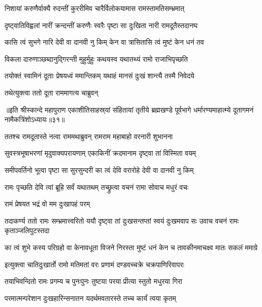 \twolineshloka
{निशायां करुणैर्वाक्यै रुदन्तीं कुररीमिव}
{चारैर्विलोकयामास रामस्तामतिसम्भ्रमात्}%

\twolineshloka
{दृष्ट्वातिविह्वलां नारीं क्रन्दन्तीं करुणैः स्वरैः}
{पृष्टा सा दुःखिता नारी रामदूतैस्तदानघ}%


\twolineshloka
{कासि त्वं सुभगे नारि देवी वा दानवी नु किम्}
{केन वा त्रासितासि त्वं मुष्टं केन धनं तव}%

\twolineshloka
{विकला दारुणाञ्छब्दानुद्गिरन्ती मुहुर्मुहुः}
{कथयस्व यथातथ्यं रामो राजाभिपृच्छति}%

\twolineshloka
{तयोक्तं स्वामिनं दूताः प्रेषयध्वं ममान्तिकम्}
{यथाहं मानसं दुःखं शान्त्यै तस्मै निवेदये}%

\onelineshloka
{तथेत्युक्त्वा ततो दूता राममागत्य चाब्रुवन्}%

॥इति श्रीस्कान्दे महापुराण एकाशीतिसाहस्र्यां संहितायां तृतीये ब्रह्मखण्डे पूर्वभागे धर्मारण्यमाहात्म्ये दूतागमनं नामैकत्रिंशोऽध्यायः॥३१॥


\twolineshloka
{ततश्च रामदूतास्ते नत्वा राममथाब्रुवन्}
{रामराम महाबाहो वरनारी शुभानना}%

\twolineshloka
{सुवस्त्रभूषाभरणां मृदुवाक्यपरायणाम्}
{एकाकिनीं क्रदमानाम दृष्ट्वा तां विस्मिता वयम्}%

\twolineshloka
{समीपवर्तिनो भूत्वा पृष्टा सा सुरसुन्दरी}
{का त्वं देवि वरारोहे देवी वा दानवी नु किम्}%

\twolineshloka
{रामः पृच्छति देवि त्वां ब्रूहि सर्वं यथातथम्}
{तच्छ्रुत्वा वचनं रामा सोवाच मधुरं वचः}%

\onelineshloka
{रामं प्रेषयत भद्रं वो मम दुःखापहं परम्}%

\threelineshloka
{तदाकर्ण्य ततो रामः सम्भ्रमात्त्वरितो ययौ}
{दृष्ट्वा तां दुःखसन्तप्तां स्वयं दुःखमवाप सः}
{उवाच वचनं रामः कृताञ्जलिपुटस्तदा}%


\twolineshloka
{का त्वं शुभे कस्य परिग्रहो वा केनावधूता विजने निरस्ता}
{मुष्टं धनं केन च तावकीनमाचक्ष्व मातः सकलं ममाग्रे}%

\twolineshloka
{इत्युक्त्वा चातिदुःखार्तो रामो मतिमतां वरः}
{प्रणामं दण्डवच्चक्रे चक्रपाणिरिवापरः} %

\twolineshloka
{तयाभिवन्दितो रामः प्रगम्य च पुनःपुनः}
{तुष्टया परया प्रीत्या स्तुतो मधुरया गिरा}%

\twolineshloka
{परमात्मन्परेशान दुःखहारिन्सनातन}
{यदर्थमवतारस्ते तच्च कार्यं त्वया कृतम्}%

